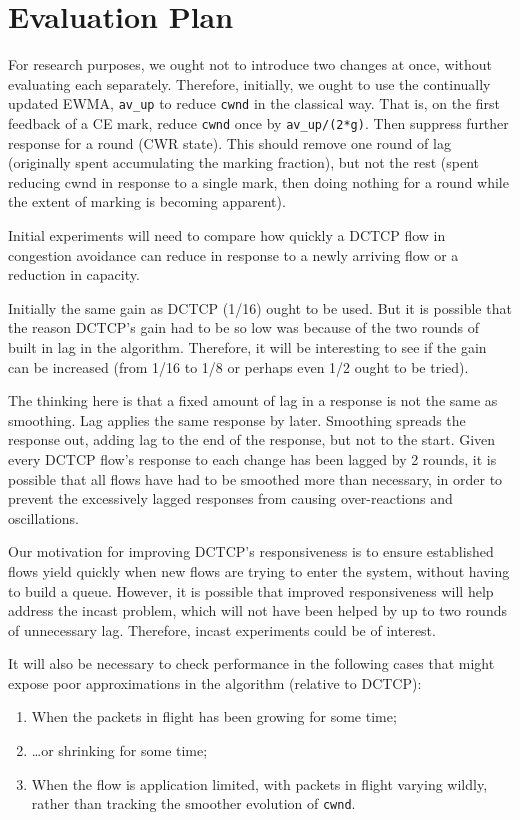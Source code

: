\section{Evaluation Plan}\label{prresp_Evaluation}

For research purposes, we ought not to introduce two changes at once, without evaluating each separately. Therefore, initially, we ought to use the continually updated EWMA, \texttt{av\_up} to reduce \texttt{cwnd} in the classical way. That is, on the first feedback of a CE mark, reduce \texttt{cwnd} once by \texttt{av\_up/(2*g)}. Then suppress further response for a round (CWR state). This should remove one round of lag (originally spent accumulating the marking fraction), but not the rest (spent reducing cwnd in response to a single mark, then doing nothing for a round while the extent of marking is becoming apparent).

Initial experiments will need to compare how quickly a DCTCP flow in congestion avoidance can reduce in response to a newly arriving flow or a reduction in capacity.

Initially the same gain as DCTCP (1/16) ought to be used. But it is possible that the reason DCTCP's gain had to be so low was because of the two rounds of built in lag in the algorithm. Therefore, it will be interesting to see if the gain can be increased (from 1/16 to 1/8 or perhaps even 1/2 ought to be tried).

The thinking here is that a fixed amount of lag in a response is not the same as smoothing. Lag applies the same response by later. Smoothing spreads the response out, adding lag to the end of the response, but not to the start. Given every DCTCP flow's response to each change has been lagged by 2 rounds, it is possible that all flows have had to be smoothed more than necessary, in order to prevent the excessively lagged responses from causing over-reactions and oscillations.

Our motivation for improving DCTCP's responsiveness is to ensure established flows yield quickly when new flows are trying to enter the system, without having to build a queue. However, it is possible that improved responsiveness will help address the incast problem, which will not have been helped by up to two rounds of unnecessary lag. Therefore, incast experiments could be of interest.

It will also be necessary to check performance in the following cases that might expose poor approximations in the algorithm (relative to DCTCP):
\begin{enumerate}
	\item When the packets in flight has been growing for some time;
	\item \ldots{}or shrinking for some time;
	\item When the flow is application limited, with packets in flight varying wildly, rather than tracking the smoother evolution of \texttt{cwnd}.
\end{enumerate}

